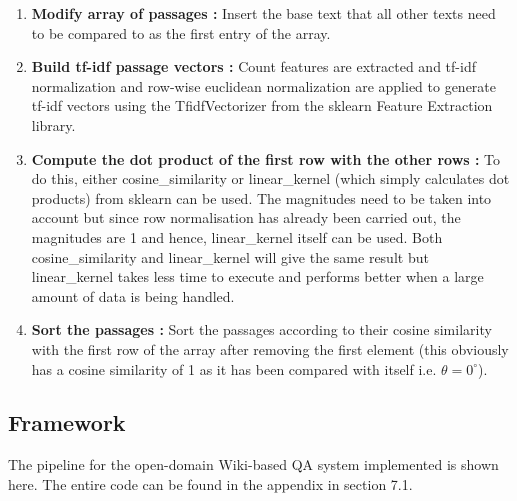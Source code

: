 \documentclass[12pt, a4paper]{article}
\begin{document}
\begin{enumerate}
    \item \textbf{Modify array of passages :} Insert the base text that all other texts need to be compared to as the first entry of the array. 
    \item \textbf{Build tf-idf passage vectors :} Count features are extracted and tf-idf normalization and row-wise euclidean normalization are applied to generate tf-idf vectors using the TfidfVectorizer from the sklearn Feature Extraction library. 
    \item \textbf{Compute the dot product of the first row with the other rows :} To do this, either cosine\_similarity or linear\_kernel (which simply calculates dot products) from sklearn can be used. The magnitudes need to be taken into account but since row normalisation has already been carried out, the magnitudes are 1 and hence, linear\_kernel itself can be used. Both cosine\_similarity and linear\_kernel will give the same result but linear\_kernel takes less time to execute and performs better when a large amount of data is being handled. 
    \item \textbf{Sort the passages :} Sort the passages according to their cosine similarity with the first row of the array after removing the first element (this obviously has a cosine similarity of 1 as it has been compared with itself i.e. \(\theta = 0^\circ\)). 
\end{enumerate}

\subsection{Framework} 

The pipeline for the open-domain Wiki-based QA system implemented is shown here. The entire code can be found in the appendix in section 7.1. 
\end{document}
